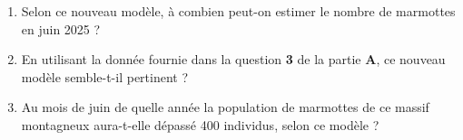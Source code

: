\documentclass[10pt]{article}
\begin{document}
\begin{enumerate}
		\begin{enumerate}
			\item Selon ce nouveau modèle, à combien peut-on estimer le nombre de marmottes en juin 2025 ?
			
			\item En utilisant la donnée fournie dans la question \textbf{3} de la partie \textbf{A}, ce nouveau modèle semble-t-il pertinent ?
			
			\item Au mois de juin de quelle année la population de marmottes de ce massif montagneux aura-t-elle dépassé 400 individus, selon ce modèle ?
		\end{enumerate}
	\end{enumerate}
\end{document}
